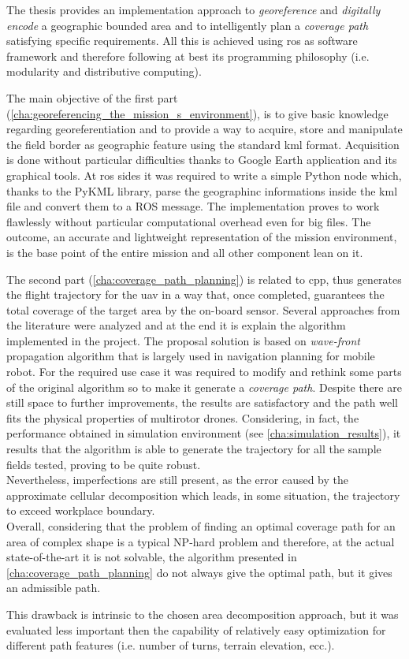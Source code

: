 The thesis provides an implementation approach to \textit{georeference} and \textit{digitally encode} a geographic bounded area and to intelligently plan a \textit{coverage path} satisfying specific requirements. All this is achieved using \acrshort{ros} as software framework and therefore following at best its programming philosophy (i.e. modularity and distributive computing).\par
The main objective of the first part (\autoref{cha:georeferencing_the_mission_s_environment}), is to give basic knowledge regarding georeferentiation and to provide a way to acquire, store and manipulate the field border as geographic feature using the standard \acrfull{kml} format. Acquisition is done without particular difficulties thanks to Google Earth application and its graphical tools. At \acrshort{ros} sides it was required to write a simple Python node which, thanks to the \textsf{PyKML library}, parse the geographinc informations inside the \acrshort{kml} file and convert them to a ROS message. The implementation proves to work flawlessly without particular computational overhead even for big files. The outcome, an accurate and lightweight representation of the mission environment, is the base point of the entire mission and all other component lean on it.\par
The second part (\autoref{cha:coverage_path_planning}) is related to \acrfull{cpp}, thus generates the flight trajectory for the \acrshort{uav} in a way that, once completed, guarantees the total coverage of the target area by the on-board sensor. Several approaches from the literature were analyzed and at the end it is explain the algorithm implemented in the project. The proposal solution is based on \textit{wave-front} propagation algorithm that is largely used in navigation planning for mobile robot. For the required use case it was required to modify and rethink some parts of the original algorithm so to make it generate a \textit{coverage path}. Despite there are still space to further improvements, the results are satisfactory and the path well fits the physical properties of multirotor drones. Considering, in fact, the performance obtained in simulation environment (see \autoref{cha:simulation_results}), it results that the algorithm is able to generate the trajectory for all the sample fields tested, proving to be quite robust.\\
Nevertheless, imperfections are still present, as the error caused by the approximate cellular decomposition which leads, in some situation, the trajectory to exceed workplace boundary.\\
Overall, considering that the problem of finding an optimal coverage path for an area of complex shape is a typical NP-hard problem and therefore, at the actual state-of-the-art it is not solvable, the algorithm presented in \autoref{cha:coverage_path_planning} do not always give the optimal path, but it gives an admissible path.\par
This drawback is intrinsic to the chosen area decomposition approach, but it was evaluated less important then the capability of relatively easy optimization for different path features (i.e. number of turns, terrain elevation, ecc.).\par

